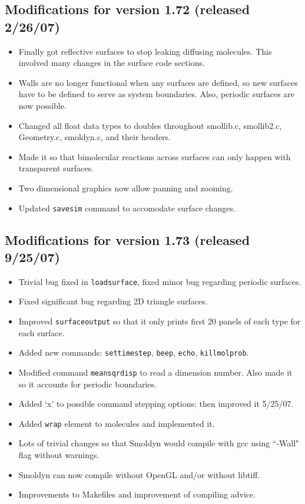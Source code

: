 \documentclass {scrbook}
\newcommand {\ttt} {\texttt}
\begin{document}
\subsection{Modifications for version 1.72 (released 2/26/07)}
\begin{itemize}
\item Finally got reflective surfaces to stop leaking diffusing molecules. This involved many changes in the surface code sections.
\item Walls are no longer functional when any surfaces are defined, so new surfaces have to be defined to serve as system boundaries. Also, periodic surfaces are now possible.
\item Changed all float data types to doubles throughout smollib.c, smollib2.c, Geometry.c, smoldyn.c, and their headers.
\item Made it so that bimolecular reactions across surfaces can only happen with transparent surfaces.
\item Two dimensional graphics now allow panning and zooming.
\item Updated \ttt{savesim} command to accomodate surface changes.
\end{itemize}

\subsection{Modifications for version 1.73 (released 9/25/07)}
\begin{itemize}
\item Trivial bug fixed in \ttt{loadsurface}, fixed minor bug regarding periodic surfaces.
\item Fixed significant bug regarding 2D triangle surfaces.
\item Improved \ttt{surfaceoutput} so that it only prints first 20 panels of each type for each surface.
\item Added new commands: \ttt{settimestep}, \ttt{beep}, \ttt{echo}, \ttt{killmolprob}.
\item Modified command \ttt{meansqrdisp} to read a dimension number. Also made it so it accounts for periodic boundaries.
\item Added `x' to possible command stepping options; then improved it 5/25/07.
\item Added \ttt{wrap} element to molecules and implemented it.
\item Lots of trivial changes so that Smoldyn would compile with gcc using ``-Wall" flag without warnings.
\item Smoldyn can now compile without OpenGL and/or without libtiff.
\item Improvements to Makefiles and improvement of compiling advice.
\end{itemize}
\end{document}
